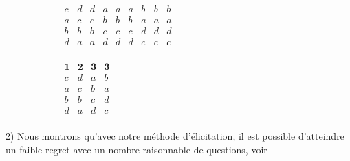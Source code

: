 	\begin{figure}
		\centering
		\caption{Profil représentant une question posée à la commission sous forme étendue (a) et compacte (b).}
		\begin{subfigure}[b]{0.49\textwidth}
			\begin{center}
				$
				\begin{array}{ccccccccc}
					c&d&d&a&a&a&b&b&b\\
					a&c&c&b&b&b&a&a&a\\
					b&b&b&c&c&c&d&d&d\\
					d&a&a&d&d&d&c&c&c\\
				\end{array}
				$
			\end{center}
			\caption{}
			\label{fig:profileQstCommFrench}
		\end{subfigure}
		\hfill
		\begin{subfigure}[b]{0.49\textwidth}
			\begin{center}
				$
				\begin{array}{cccc}
					\mathbf{1}&\mathbf{2}&\mathbf{3}&\mathbf{3} \\
					c&d&a&b\\
					a&c&b&a\\
					b&b&c&d\\
					d&a&d&c\\
				\end{array}
				$
			\end{center}
			\caption{}
			\label{fig:profileQstCommCompactFrench}
		\end{subfigure}
	\end{figure} 
	
	
	2) Nous montrons qu'avec notre méthode d'élicitation, il est possible d'atteindre un faible regret avec un nombre raisonnable de questions, voir 
	
